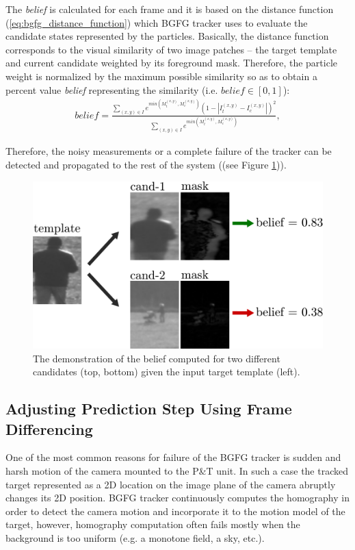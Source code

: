 The \textit{belief} is calculated for each frame and it is based on the distance function (\ref{eq:bgfg_distance_function}) which BGFG tracker uses to evaluate the candidate states represented by the particles. Basically, the distance function corresponds to the visual similarity of two image patches -- the target template and current candidate weighted by its foreground mask. Therefore, the particle weight is normalized by the maximum possible similarity so as to obtain a percent value \textit{belief} representing the similarity (i.e. $\textit{belief} \in [0, 1]$):
\begin{align}
	belief = \frac{\sum_{(x,y) \in I}{e^{min(M_{t}^{(x,y)}, M_{c}^{(x,y)})}(1 - |I_{t}^{(x,y)} - I_{c}^{(x,y)}|)^{2}}}{\sum_{(x,y) \in I}{e^{min(M_{t}^{(x,y)}, M_{c}^{(x,y)})}}},
\end{align}

Therefore, the noisy measurements or a complete failure of the tracker can be detected and propagated to the rest of the system ((see Figure \ref{fig:belief})).

\begin{figure}[htb]
	\centering
	\includegraphics[width=0.5\linewidth]{fig/belief.pdf}
	\caption{The demonstration of the belief computed for two different candidates (top, bottom) given the input target template (left).}
	\label{fig:belief}
\end{figure}

\subsection{Adjusting Prediction Step Using Frame Differencing} \label{txt:adjusting_prediction_step}

One of the most common reasons for failure of the BGFG tracker is sudden and harsh motion of the camera mounted to the P\&T unit. In such a case the tracked target represented as a 2D location on the image plane of the camera abruptly changes its 2D position. BGFG tracker continuously computes the homography \cite{ObjectTrackinginMonochromaticVideo} in order to detect the camera motion and incorporate it to the motion model of the target, however, homography computation often fails mostly when the background is too uniform (e.g. a monotone field, a sky, etc.).

